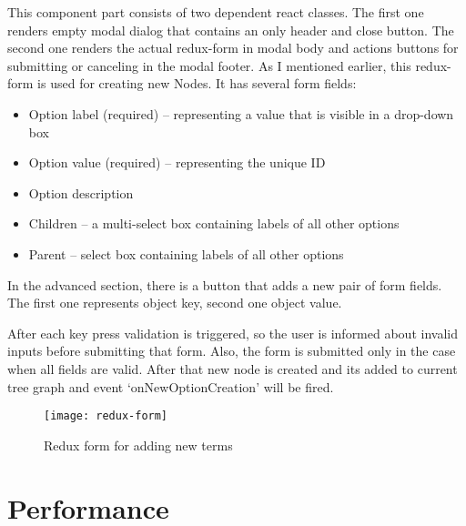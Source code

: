 This component part consists of two dependent react classes. The first one renders empty modal dialog that contains an
only header and close button. The second one renders the actual redux-form in modal body and actions buttons for
submitting or canceling in the modal footer. As I mentioned earlier, this redux-form is used for creating new Nodes. It has several form fields:
\begin{itemize}
    \item Option label (required) – representing a value that is visible in a drop-down box
    \item Option value (required) – representing the unique ID
    \item Option description
    \item Children – a multi-select box containing labels of all other options
    \item Parent – select box containing labels of all other options
\end{itemize}
In the advanced section, there is a button that adds a new pair of form fields. The first one represents object key, second one object value.


After each key press validation is triggered, so the user is informed about invalid inputs before submitting that form. Also, the form is submitted only in the case when all fields are valid. After that new node is created and its added to current tree graph and event ‘onNewOptionCreation’ will be fired.

\begin{figure}[th]
    \centering
    \texttt{[image: redux-form]}
    \decoRule
    \caption[Redux form]{Redux form for adding new terms}
    \label{fig:redux-form}
 \end{figure}





\section{Performance}


